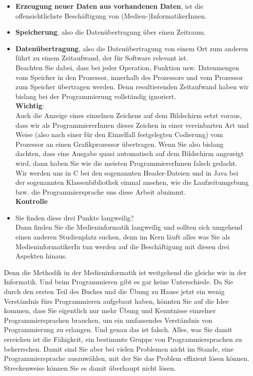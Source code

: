 \begin{itemize}
	\item \textbf{Erzeugung neuer Daten aus vorhandenen Daten}, ist die offensichtlichste Beschäftigung von (Medien-)InformatikerInnen.
	\item \textbf{Speicherung}, also die Datenübertragung über einen Zeitraum.
	\item \textbf{Datenübertragung}, also die Datenübertragung von einem Ort zum anderen führt zu einem Zeitaufwand, der für Software relevant ist.\\
	Beachten Sie dabei, dass bei jeder Operation, Funktion usw. Datenmengen vom Speicher in den Prozessor, innerhalb des Prozessors und vom Prozessor zum Speicher übertragen werden. Denn resultierenden Zeitaufwand haben wir bislang bei der Programmierung vollständig ignoriert.\\
	
	\textbf{Wichtig}:\\
	
	Auch die Anzeige eines einzelnen Zeichens auf dem Bildschirm setzt voraus, dass wir als ProgrammiererInnen dieses Zeichen in einer vereinbarten Art und Weise (also nach einer für den Einzelfall festgelegten Codierung) vom Prozessor an einen Grafikprozessor übertragen. Wenn Sie also bislang dachten, dass eine Ausgabe quasi automatisch auf dem Bildschirm angezeigt wird, dann haben Sie wie die meisten ProgrammiererInnen falsch gedacht. Wir werden uns in C bei den sogenannten Header-Dateien und in Java bei der sogenannten Klassenbibliothek einmal ansehen, wie die Laufzeitumgebung bzw. \glqq{}die Programmiersprache\grqq{} uns diese Arbeit abnimmt.\\

	\textbf{Kontrolle}\\

	\item Sie finden diese drei Punkte langweilig?\\
	
	Dann finden Sie die Medieninformatik langweilig und sollten sich umgehend einen anderen Studienplatz suchen, denn im Kern läuft alles was Sie als MedieninformatikerIn tun werden auf die Beschäftigung mit diesen drei Aspekten hinaus.
\end{itemize}

Denn die Methodik in der Medieninformatik ist weitgehend die gleiche wie in der Informatik. Und beim Programmieren gibt es gar keine Unterschiede. Da Sie durch den ersten Teil des Buches und die Übung zu Hause jetzt ein wenig Verständnis fürs Programmieren aufgebaut haben, könnten Sie auf die Idee kommen, dass Sie eigentlich nur mehr Übung und Kenntnisse einzelner Programmiersprachen brauchen, um ein umfassendes Verständnis von Programmierung zu erlangen. Und genau das ist falsch. Alles, was Sie damit erreichen ist die Fähigkeit, ein bestimmte Gruppe von Programmiersprachen zu beherrschen. Damit sind Sie aber bei vielen Problemen nicht im Stande, eine Programmiersprache auszuwählen, mit der Sie das Problem effizient lösen können. Streckenweise können Sie es damit überhaupt nicht lösen.\\

